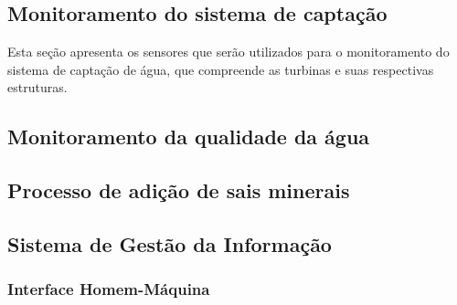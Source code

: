     \subsection{Monitoramento do sistema de captação}
      
      Esta seção apresenta os sensores que serão utilizados para o monitoramento do sistema de captação
      de água, que compreende as turbinas e suas respectivas estruturas.
      
      
      
      
      
    \subsection{Monitoramento da qualidade da água}
    
      
    
    \pagebreak
    \subsection{Processo de adição de sais minerais}
    
      
    
    \vfill
    
    \pagebreak
    \subsection{Sistema de Gestão da Informação}
      
      
    \subsubsection{Interface Homem-Máquina}
      	

    
    
    
    
    